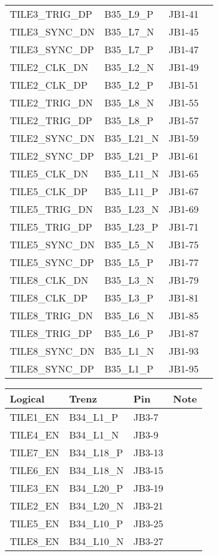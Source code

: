 \documentclass[12pt]{article}
\begin{document}
\begin{tabular}{llll}
TILE3\_TRIG\_DP     & B35\_L9\_P   & JB1-41 & \\
TILE3\_SYNC\_DN     & B35\_L7\_N   & JB1-45 & \\
TILE3\_SYNC\_DP     & B35\_L7\_P   & JB1-47 & \\
\hline
TILE2\_CLK\_DN      & B35\_L2\_N   & JB1-49 & \\
TILE2\_CLK\_DP      & B35\_L2\_P   & JB1-51 & \\
TILE2\_TRIG\_DN     & B35\_L8\_N   & JB1-55 & \\
TILE2\_TRIG\_DP     & B35\_L8\_P   & JB1-57 & \\
TILE2\_SYNC\_DN     & B35\_L21\_N  & JB1-59 & \\
TILE2\_SYNC\_DP     & B35\_L21\_P  & JB1-61 & \\
\hline
TILE5\_CLK\_DN      & B35\_L11\_N  & JB1-65 & \\
TILE5\_CLK\_DP      & B35\_L11\_P  & JB1-67 & \\
TILE5\_TRIG\_DN     & B35\_L23\_N  & JB1-69 & \\
TILE5\_TRIG\_DP     & B35\_L23\_P  & JB1-71 & \\
TILE5\_SYNC\_DN     & B35\_L5\_N   & JB1-75 & \\
TILE5\_SYNC\_DP     & B35\_L5\_P   & JB1-77 & \\
\hline
TILE8\_CLK\_DN      & B35\_L3\_N   & JB1-79 & \\
TILE8\_CLK\_DP      & B35\_L3\_P   & JB1-81 & \\
TILE8\_TRIG\_DN     & B35\_L6\_N   & JB1-85 & \\
TILE8\_TRIG\_DP     & B35\_L6\_P   & JB1-87 & \\
TILE8\_SYNC\_DN     & B35\_L1\_N   & JB1-93 & \\
TILE8\_SYNC\_DP     & B35\_L1\_P   & JB1-95 & \\
\end{tabular}

\newpage
\begin{tabular}{llll}
\hline
Logical & Trenz & Pin & Note\\  
\hline
TILE1\_EN & B34\_L1\_P    & JB3-7  & \\
TILE4\_EN & B34\_L1\_N    & JB3-9  & \\
TILE7\_EN & B34\_L18\_P   & JB3-13 & \\
TILE6\_EN & B34\_L18\_N   & JB3-15 & \\
TILE3\_EN & B34\_L20\_P   & JB3-19 & \\
TILE2\_EN & B34\_L20\_N   & JB3-21 & \\
TILE5\_EN & B34\_L10\_P   & JB3-25 & \\
TILE8\_EN & B34\_L10\_N   & JB3-27 & \\
\hline
\end{tabular}
\end{document}
